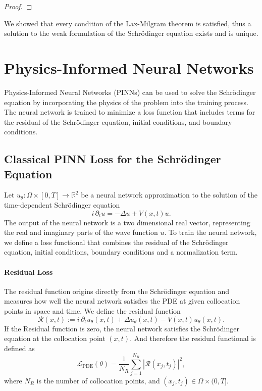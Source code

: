 \documentclass{article}
\theoremstyle{definition}
\theoremstyle{plain}
\theoremstyle{remark}
\newcommand{\R}{\mathbb{R}}
\begin{document}
\begin{proof}
\end{proof}
We showed that every condition of the Lax-Milgram theorem is satisfied, thus a solution to the weak formulation of the Schrödinger equation exists and is unique.

\newpage

\section{Physics-Informed Neural Networks}

Physics-Informed Neural Networks (PINNs) can be used to solve the Schrödinger equation by incorporating the physics of the problem into the training process. The neural network is trained to minimize a loss function that includes terms for the residual of the Schrödinger equation, initial conditions, and boundary conditions.

\subsection*{Classical PINN Loss for the Schrödinger Equation}

Let $u_\theta : \Omega \times [0,T] \to \R^2$ be a neural network approximation to the solution of the time-dependent Schrödinger equation
\[
i \, \partial_t u = -\Delta u + V(x,t) u.
\]
The output of the neural network is a two dimensional real vector, representing the real and imaginary parts of the wave function \( u \).
To train the neural network, we define a loss functional that combines the residual of the Schrödinger equation, initial conditions, boundary conditions and a normalization term.
\paragraph{Residual Loss}
The residual function origins directly from the Schrödinger equation and measures how well the neural network satisfies the PDE at given collocation points in space and time.
We define the residual function
\[
\mathcal{R}(x,t) := i \, \partial_t u_\theta(x,t) + \Delta u_\theta(x,t) - V(x,t) u_\theta(x,t).
\]
If the Residual function is zero, the neural network satisfies the Schrödinger equation at the collocation point $(x,t)$.
And therefore the residual functional is defined as
\[
\mathcal{L}_{\mathrm{PDE}}(\theta) = \frac{1}{N_R} \sum_{j=1}^{N_R} \left| \mathcal{R}(x_j, t_j) \right|^2,\]
where \( N_R \) is the number of collocation points, and \( (x_j, t_j) \in \Omega \times (0,T] \).
\end{document}
